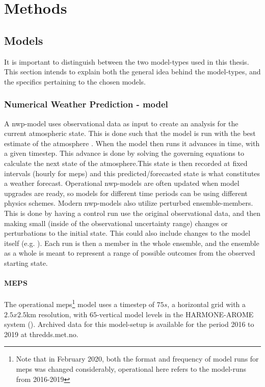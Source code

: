 \setcounter{chapter}{2}
\chapter{Methods}

\section{Models}\label{sec:models}

It is important to distinguish between the two model-types used in this thesis. This section intends to explain both the general idea behind the model-types, and the specifics pertaining to the chosen models.

\subsection{Numerical Weather Prediction - model}\label{sec:nwp}

A \acrfull{nwp}-model uses observational data as input to create an analysis for the current atmospheric state. This is done such that the model is run with the best estimate of the atmosphere . When the model then runs it advances in time, with a given timestep. This advance is done by solving the governing equations to calculate the next state of the atmosphere.This state is then recorded at fixed intervals (hourly for \acrshort{meps}) and this predicted/forecasted state is what constitutes a weather forecast. Operational \acrshort{nwp}-models are often updated when model upgrades are ready, so models for different time periods can be using different physics schemes. Modern \acrshort{nwp}-models also utilize perturbed ensemble-members. This is done by having a control run use the original observational data, and then making small (inside of the observational uncertainty range) changes or perturbations to the initial state. This could also include changes to the model itself (e.g. \cite{toth1993}). Each run is then a member in the whole ensemble, and the ensemble as a whole is meant to represent a range of possible outcomes from the observed starting state.

\subsubsection{MEPS}\label{sec:meps}

The operational \acrfull{meps}\footnote{Note that in February 2020, both the format and frequency of model runs for \acrfull{meps} was changed considerably, operational here refers to the model-runs from 2016-2019} model uses a timestep of $75s$, a horizontal grid with a $2.5x2.5$km  resolution, with $65$-vertical model levels in the HARMONE-AROME system (\cite{bengtsson2017}). Archived data for this model-setup is available for the period 2016 to 2019 at thredds.met.no.

